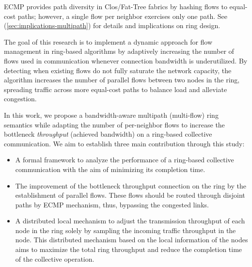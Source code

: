 \documentclass[12pt]{article}
\begin{document}
ECMP provides path diversity in Clos/Fat-Tree fabrics by hashing flows to equal-cost paths; however, a single flow per neighbor exercises only one path. See (\ref{sec:implications-multipath}) for details and implications on ring design.


The goal of this research is to implement a dynamic approach for flow management in ring-based algorithms by adaptively increasing the number of flows used in communication whenever connection bandwidth is underutilized. 
By detecting when existing flows do not fully saturate the network capacity, the algorithm increases the number of parallel flows between two nodes in the ring, spreading traffic across more equal-cost paths to balance load and alleviate congestion.

In this work, we propose a bandwidth-aware multipath (multi-flow) ring semantics while adapting the number of per-neighbor flows to increase the bottleneck \emph{throughput} (achieved bandwidth) on a ring-based collective communication. We aim to establish three main contribution through this study:

\begin{itemize}[leftmargin=*]
\item A formal framework to analyze the performance of a ring-based collective communication with the aim of minimizing its completion time. 
\item The improvement of the bottleneck throughput connection on the ring by the establishment of parallel flows. These flows should be routed through disjoint paths by ECMP mechanism, thus, bypassing the congested links.
\item A distributed local mechanism to adjust the transmission throughput of each node in the ring solely by sampling the incoming traffic throughput in the node. This distributed mechanism based on the local information of the nodes aims to maximize the total ring throughput and reduce the completion time of the collective operation.
\end{itemize}
\end{document}
